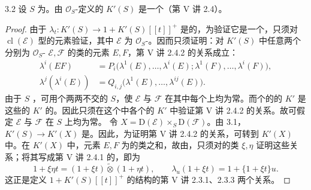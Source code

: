 \begin{SGAresult}{}{3.2}
设 $S$ 为。由 $\mathcal O_S$-定义的 $K'(S)$ 是一个（第 V 讲 2.4）。
\end{SGAresult}
\begin{proof}
由于 $\lambda_t\colon K'(S)\longrightarrow 1+K'(S)[[t]]^+$ 是的，为验证它是一个，只须对 $\operatorname{cl}(\mathcal E)$ 型的元素验证，其中 $\mathcal E$ 为 $\mathcal O_S$-。因而只须证明：对 $K'(S)$ 中任意两个分别为 $\mathcal O_S$- $\mathcal E,\mathcal F$ 的类的元素 $E,F$，第 V 讲 2.4.2 的关系成立：
\[
\begin{aligned}
\lambda^i(EF)&=P_i\bigl(\lambda^1(E),\ldots,\lambda^i(E);\lambda^1(F),\ldots,\lambda^i(F)\bigr),\\
\lambda^j(\lambda^i(E))&=Q_{i,j}\bigl(\lambda^1(E),\ldots,\lambda^{ij}(E)\bigr).
\end{aligned}
\]
由于 $S$ ，可用个两两不交的 $S$，使 $\mathcal E$ 与 $\mathcal F$ 在其中每个上均为常。而个的的 $K'$ 是这些的 $K'$ 的。因此只须在这个中各个的 $K'$ 中验证第 V 讲 2.4.2 的关系。故可假定 $\mathcal E$ 与 $\mathcal F$ 在 $S$ 上均为常。
令 $X=\mathrm D(\mathcal E)\times_S\mathrm D(\mathcal F)$。由 3.1， $K'(S)\longrightarrow K'(X)$ 是。因此，为证明第 V 讲 2.4.2 的关系，可转到 $K'(X)$ 中。在 $K'(X)$ 中，元素 $E,F$ 为的类之和，故由，只须对的类 $\xi,\eta$ 证明这些关系；将其写成第 V 讲 2.4.1 的，即为
\[
1+\xi\eta t=(1+\xi t)\mathbin{\widetilde\otimes}(1+\eta t),\qquad
\lambda_u(1+\xi t)=1+\{1+\xi t\}u.
\]
这正是定义 $1+K'(S)[[t]]^+$ 的结构的第 V 讲 2.3.1、2.3.3 两个关系。
\end{proof}

